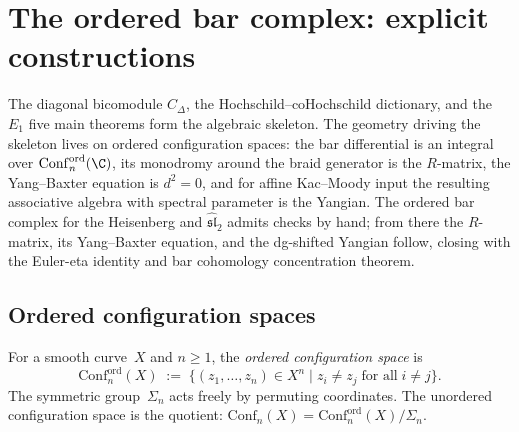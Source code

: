 \section{The ordered bar complex: explicit constructions}
\label{sec:ordered-bar-explicit}

The diagonal bicomodule $C_\Delta$, the Hochschild--coHochschild
dictionary, and the $E_1$ five main theorems form the algebraic
skeleton. The geometry driving the skeleton lives on ordered
configuration spaces: the bar differential is an integral over
$\mathrm{Conf}_n^{\mathrm{ord}}(\C)$, its monodromy around the braid
generator is the $R$-matrix, the Yang--Baxter equation is $d^2=0$,
and for affine Kac--Moody input the resulting associative algebra
with spectral parameter is the Yangian. The ordered bar complex for
the Heisenberg and $\widehat{\mathfrak{sl}}_2$ admits checks by
hand; from there the $R$-matrix, its Yang--Baxter equation, and the
dg-shifted Yangian follow, closing with the Euler-eta identity and
bar cohomology concentration theorem.

\subsection{Ordered configuration spaces}
\label{subsec:ordered-config-spaces}

\begin{definition}
\label{def:ordered-config-space}
For a smooth curve~$X$ and $n\ge 1$, the \emph{ordered
configuration space} is
\[
\mathrm{Conf}_n^{\mathrm{ord}}(X)
\;:=\;
\bigl\{(z_1,\dots,z_n)\in X^n
\;\big|\;
z_i\neq z_j\;\text{for all}\;i\neq j\bigr\}.
\]
The symmetric group~$\Sigma_n$ acts freely by permuting
coordinates. The unordered configuration space is the
quotient:
$\mathrm{Conf}_n(X)
=\mathrm{Conf}_n^{\mathrm{ord}}(X)/\Sigma_n$.
\end{definition}

